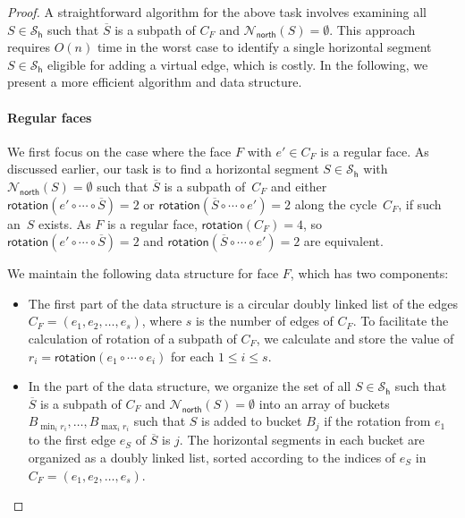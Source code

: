 \documentclass{article}\usepackage[a4paper,margin=20mm]{geometry}
\newcommand{\PH}{\mathcal{S}_\mathsf{h}}
\newcommand{\Nnorth}{\mathcal{N}_\mathsf{north}}
\newcommand{\rotation}{\mathsf{rotation}}
\begin{document}
\begin{proof}
 A straightforward algorithm for the above task involves examining all $S \in \PH$ such that $\overline{S}$ is a subpath of $C_F$ and $\Nnorth(S) = \emptyset$. This approach requires 
$O(n)$ time in the worst case to identify a single horizontal segment $S \in \PH$ eligible for adding a virtual edge, which is costly. In the following, we present a more efficient algorithm and data structure.  
 
  \paragraph{Regular faces}
 We first focus on the case where the face $F$ with $e' \in C_F$ is a regular face. As discussed earlier, our task is to find a horizontal segment $S \in \PH$ with $\Nnorth(S) = \emptyset$ such that $\overline{S}$ is a subpath of~$C_F$ and either $\rotation(e' \circ \cdots \circ \overline{S}) = 2$ or  $\rotation(\overline{S} \circ \cdots \circ e') = 2$ along the cycle~$C_F$, if such an~$S$ exists. As $F$  is a regular face, $\rotation(C_F)=4$, so $\rotation(e' \circ \cdots \circ \overline{S}) = 2$ and  $\rotation(\overline{S} \circ \cdots \circ e') = 2$ are equivalent. 

We maintain the following data structure for face $F$, which has two components:
\begin{itemize}
    \item The first part of the data structure is a circular doubly linked list of the edges $C_F=(e_1, e_2, \ldots, e_s)$, where $s$ is the number of edges of $C_F$. To facilitate the calculation of rotation of a subpath of $C_F$, we calculate and store the value of $r_i = \rotation(e_1 \circ \cdots \circ e_i)$ for each $1 \leq i \leq s$.
    \item In the part of the data structure, we organize the set of all $S \in \PH$ such that $\overline{S}$ is a subpath of $C_F$ and $\Nnorth(S) = \emptyset$ into an array of buckets $B_{\min_i r_i}, \ldots, B_{\max_i r_i}$ such that $S$ is added to bucket $B_j$ if the rotation from $e_1$ to the first edge $e_S$ of $\overline{S}$ is $j$. The horizontal segments in each bucket are organized as a doubly linked list, sorted according to the indices of $e_S$ in $C_F=(e_1, e_2, \ldots, e_s)$. 
\end{itemize}
 
 
 

\end{proof}
\end{document}
